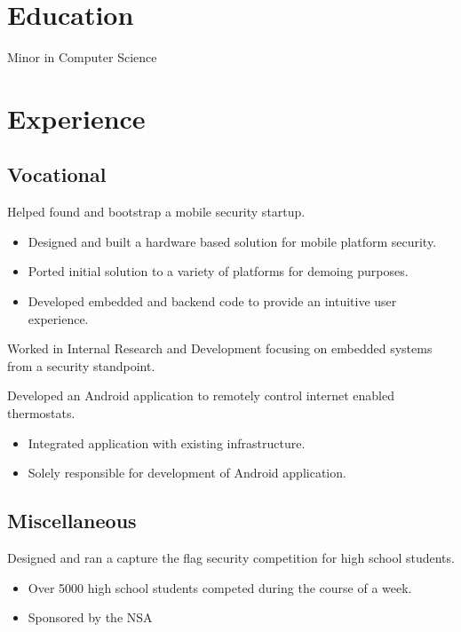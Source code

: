 \documentclass[10pt,a4paper,sans]{moderncv}
\begin{document}
\makecvtitle

\section{Education}
{Minor in Computer Science}

\section{Experience}
\subsection{Vocational}
{Helped found and bootstrap a mobile security startup.
\begin{itemize}
\item Designed and built a hardware based solution for mobile platform security.
\item Ported initial solution to a variety of platforms for demoing purposes.
\item Developed embedded and backend code to provide an intuitive user experience.
\end{itemize}}

{Worked in Internal Research and Development focusing on embedded systems from a security standpoint.}

{Developed an Android application to remotely control internet enabled thermostats.
\begin{itemize}
\item Integrated application with existing infrastructure.
\item Solely responsible for development of Android application.
\end{itemize}}

\subsection{Miscellaneous}
{Designed and ran a capture the flag security competition for high school students.
\begin{itemize}
\item Over 5000 high school students competed during the course of a week.
\item Sponsored by the NSA
\end{itemize}}
\end{document}
